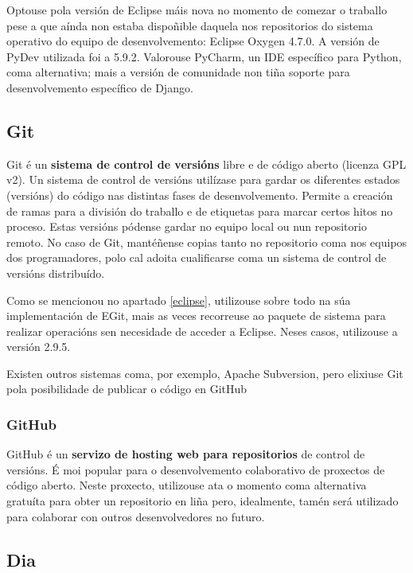 Optouse pola versión de Eclipse máis nova no momento de comezar o traballo pese a que aínda non estaba dispoñible daquela nos repositorios do sistema operativo do equipo de desenvolvemento: Eclipse Oxygen 4.7.0. A versión de PyDev utilizada foi a 5.9.2. Valorouse PyCharm, un IDE específico para Python, coma alternativa; mais a versión de comunidade non tiña soporte para desenvolvemento específico de Django\cite{pycharm}.
 


\subsection{Git}
\label{git}

Git é un \textbf{sistema de control de versións} libre e de código aberto (licenza GPL v2). Un sistema de control de versións utilízase para gardar os diferentes estados (versións) do código nas distintas fases de desenvolvemento. Permite a creación de ramas para a división do traballo e de etiquetas para marcar certos hitos no proceso. Estas versións pódense gardar no equipo local ou nun repositorio remoto. No caso de Git, mantéñense copias tanto no repositorio coma nos equipos dos programadores, polo cal adoita cualificarse coma un sistema de control de versións distribuído\cite{git}.

Como se mencionou no apartado \ref{eclipse}, utilizouse sobre todo na súa implementación de EGit, mais as veces recorreuse ao paquete de sistema para realizar operacións sen necesidade de acceder a Eclipse. Neses casos, utilizouse a versión 2.9.5.

Existen outros sistemas coma, por exemplo, Apache Subversion, pero elixiuse Git pola posibilidade de publicar o código en GitHub

\subsubsection{GitHub}  

GitHub é un \textbf{servizo de hosting web para repositorios} de control de versións. É moi popular para o desenvolvemento colaborativo de proxectos de código aberto. Neste proxecto, utilizouse ata o momento coma alternativa gratuíta para obter un repositorio en liña pero, idealmente, tamén será utilizado para colaborar con outros desenvolvedores no futuro. 


\subsection{Dia}

